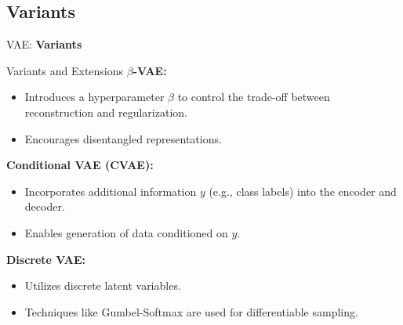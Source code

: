 \subsection{Variants}
\begin{frame}{}
	\LARGE VAE: \textbf{Variants}
\end{frame}

\begin{frame}[allowframebreaks]{Variants and Extensions}
\textbf{$\beta$-VAE:}
\begin{itemize}
    \item Introduces a hyperparameter $\beta$ to control the trade-off between reconstruction and regularization.
    \item Encourages disentangled representations.
\end{itemize}

\textbf{Conditional VAE (CVAE):}
\begin{itemize}
    \item Incorporates additional information $y$ (e.g., class labels) into the encoder and decoder.
    \item Enables generation of data conditioned on $y$.
\end{itemize}

\textbf{Discrete VAE:}
\begin{itemize}
    \item Utilizes discrete latent variables.
    \item Techniques like Gumbel-Softmax are used for differentiable sampling.
\end{itemize}
\end{frame}


